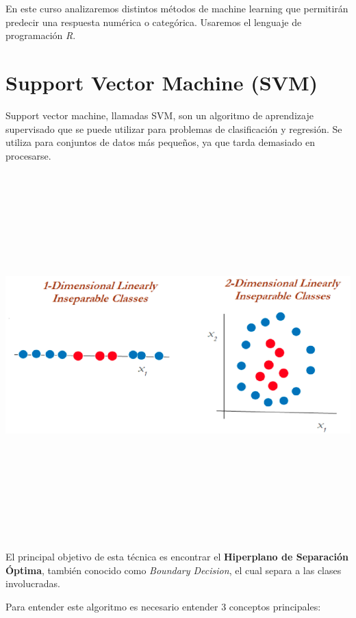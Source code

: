 \documentclass[
]{book}
\begin{document}
En este curso analizaremos distintos métodos de machine learning que permitirán predecir una respuesta numérica o categórica. Usaremos el lenguaje de programación \emph{R}.

\hypertarget{support-vector-machine-svm}{%
\section{Support Vector Machine (SVM)}\label{support-vector-machine-svm}}

Support vector machine, llamadas SVM, son un algoritmo de aprendizaje supervisado que se puede utilizar para problemas de clasificación y regresión. Se utiliza para conjuntos de datos más pequeños, ya que tarda demasiado en procesarse.

\begin{center}\includegraphics[width=800pt,height=400pt]{img/03-svm/01_inseparable_classes} \end{center}

El principal objetivo de esta técnica es encontrar el \textbf{Hiperplano de Separación Óptima}, también conocido como \emph{Boundary Decision}, el cual separa a las clases involucradas.

Para entender este algoritmo es necesario entender 3 conceptos principales:
\end{document}
